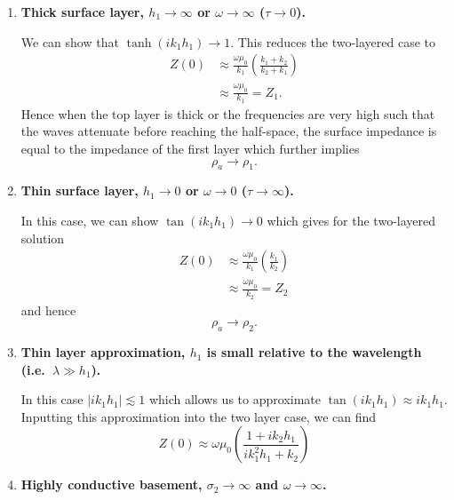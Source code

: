 \begin{enumerate}
    \item {\bf Thick surface layer, $h_1 \to \infty$ or $\omega \to \infty$
    ($\tau \to 0$).}

    We can show that $\tanh (i k_1 h_1) \to 1$.  This reduces the two-layered
    case to
    \begin{align*}
        Z(0) & \approx \frac{\omega \mu_0}{k_1}
            \left( \frac{k_1 + k_2} {k_2 + k_1} \right) \\
             & \approx \frac{\omega \mu_0}{k_1} = Z_1.
    \end{align*}
    Hence when the top layer is thick or the frequencies are very high such that
    the waves attenuate before reaching the half-space, the surface impedance is
    equal to the impedance of the first layer which further implies
    \begin{equation*}
        \rho_a \to \rho_1.
    \end{equation*}


    \item {\bf Thin surface layer, $h_1 \to 0$ or $\omega \to 0$ ($\tau \to
    \infty$).}

    In this case, we can show $\tan (i k_1 h_1) \to 0$ which gives for the
    two-layered solution
    \begin{align*}
        Z(0) & \approx \frac{\omega \mu_0}{k_1}
            \left( \frac{k_1} {k_2} \right) \\
             & \approx \frac{\omega \mu_0}{k_2} = Z_2
    \end{align*}
    and hence
    \begin{equation*}
        \rho_a \to \rho_2.
    \end{equation*}


    \item {\bf Thin layer approximation, $h_1$ is small relative to the
    wavelength (i.e.\ $\lambda \gg h_1$).}

    In this case $|i k_1 h_1| \lesssim 1$ which allows us to approximate $\tan
    (i k_1 h_1) \approx i k_1 h_1$.  Inputting this approximation into the two
    layer case, we can find
    \begin{equation}
        Z(0) \approx \omega \mu_0
            \left( \frac{1 + i k_2 h_1} {i k_1^2 h_1 + k_2} \right)
    \end{equation}


    \item {\bf Highly conductive basement, $\sigma_2 \to \infty$ and $\omega \to
    \infty$.}


\end{enumerate}
